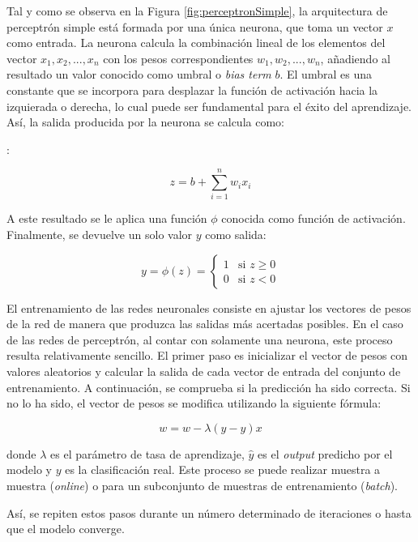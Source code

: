 \documentclass[11pt,spanish,listoffigures,listoftables]{tfgetsinf}
\begin{document}
Tal y como se observa en la Figura \ref{fig:perceptronSimple}, la arquitectura de perceptrón simple está formada por una única neurona, que toma un vector $x$ como entrada. La neurona calcula la combinación lineal de los elementos del vector $x_1, x_2, ..., x_n$ con los pesos correspondientes $w_1, w_2, ..., w_n$, añadiendo al resultado un valor conocido como umbral o \textit{bias term} $b$. El umbral es una constante que se incorpora para desplazar la función de activación hacia la izquierada o derecha, lo cual puede ser fundamental para el éxito del aprendizaje. Así, la salida producida por la neurona se calcula como:

:

 \begin{equation}
\label{form:calcularZ}
z = b + \sum_{i = 1}^n w_i x_i
\end{equation}

 A este resultado se le aplica una función $\phi$ conocida como función de activación. Finalmente, se devuelve un solo valor $y$ como salida:

\begin{equation}
y = \phi(z) = 
\begin{cases}
	1 & \text{si } z \ge 0 \\
	0 & \text{si } z < 0
\end{cases}
\end{equation}

El entrenamiento de las redes neuronales consiste en ajustar los vectores de pesos de la red de manera que produzca las salidas más acertadas posibles. En el caso de las redes de perceptrón, al contar con solamente una neurona, este proceso resulta relativamente sencillo. El primer paso es inicializar el vector de pesos con valores aleatorios y calcular la salida de cada vector de entrada del conjunto de entrenamiento. A continuación, se comprueba si la predicción ha sido correcta. Si no lo ha sido, el vector de pesos se modifica utilizando la siguiente fórmula:

\begin{equation}
w = w - \lambda(\hat{y}-y)x
\end{equation}

donde $\lambda$ es el parámetro de tasa de aprendizaje, $\hat{y}$ es el \textit{output} predicho por el modelo y $y$ es la clasificación real. Este proceso se puede realizar muestra a muestra (\textit{online}) o para un subconjunto de muestras de entrenamiento (\textit{batch}).

Así, se repiten estos pasos durante un número determinado de iteraciones o hasta que el modelo converge.
\end{document}

